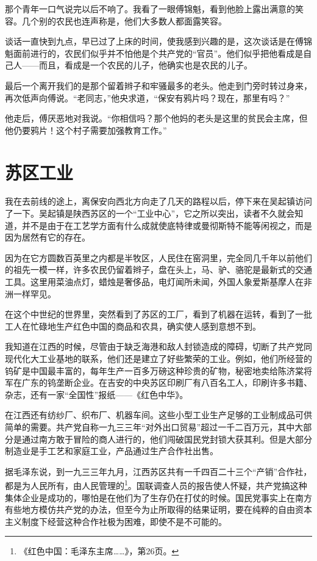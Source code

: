 \documentclass[10pt]{book}
\begin{document}
那个青年一口气说完以后不响了。我看了一眼傅锦魁，看到他脸上露出满意的笑容。几个别的农民也连声称是，他们大多数人都面露笑容。

谈话一直快到九点，早已过了上床的时间，使我感到兴趣的是，这次谈话是在傅锦魁面前进行的，农民们似乎并不怕他是个共产党的“官员”。他们似乎把他看成是自己人——而且，看成是一个农民的儿子，他确实也是农民的儿子。

最后一个离开我们的是那个留着辫子和牢骚最多的老头。他走到门旁时转过身来，再次低声向傅说。“老同志，”他央求道，“保安有鸦片吗？现在，那里有吗？”

他走后，傅厌恶地对我说。“你相信吗？那个他妈的老头是这里的贫民会主席，但他仍要鸦片！这个村子需要加强教育工作。”

\section{苏区工业}

我在去前线的途上，离保安向西北方向走了几天的路程以后，停下来在吴起镇访问了一下。吴起镇是陕西苏区的一个“工业中心”，它之所以突出，读者不久就会知道，并不是由于在工艺学方面有什么成就使底特律或曼彻斯特不能等闲视之，而是因为居然有它的存在。

因为在它方圆数百英里之内都是半牧区，人民住在窑洞里，完全同几千年以前他们的祖先一模一样，许多农民仍留着辫子，盘在头上，马、驴、骆驼是最新式的交通工具。这里用菜油点灯，蜡烛是奢侈品，电灯闻所未闻，外国人象爱斯基摩人在非洲一样罕见。

在这个中世纪的世界里，突然看到了苏区的工厂，看到了机器在运转，看到了一批工人在忙碌地生产红色中国的商品和农具，确实使人感到意想不到。

我知道在江西的时候，尽管由于缺乏海港和敌人封锁造成的障碍，切断了共产党同现代化大工业基地的联系，他们还是建立了好些繁荣的工业。例如，他们所经营的钨矿是中国最丰富的，每年生产一百多万磅这种珍贵的矿物，秘密地卖给陈济棠将军在广东的钨垄断企业。在吉安的中央苏区印刷厂有八百名工人，印刷许多书籍、杂志，还有一家“全国性”报纸——《红色中华》。

在江西还有纺纱厂、织布厂、机器车间。这些小型工业生产足够的工业制成品可供简单的需要。共产党自称一九三三年“对外出口贸易”超过一千二百万元，其中大部分是通过南方敢于冒险的商人进行的，他们闯破国民党封锁大获其利。但是大部分制造业是手工艺和家庭工业，产品通过生产合作社出售。

据毛泽东说，到一九三三年九月，江西苏区共有一千四百二十三个“产销”合作社，都是为人民所有，由人民管理的\footnote{《红色中国：毛泽东主席……》，第26页。}。国联调查人员的报告使人怀疑，共产党搞这种集体企业是成功的，哪怕是在他们为了生存仍在打仗的时候。国民党事实上在南方有些地方模仿共产党的办法，但至今为止所取得的结果证明，要在纯粹的自由资本主义制度下经营这种合作社极为困难，即使不是不可能的。
\end{document}
